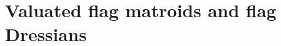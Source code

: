 \documentclass[11pt]{amsart}
\newcommand{\PP}{\mathbb P}
\newcommand{\TT}{\mathbb T}
\newcommand{\trop}{\operatorname{trop}}
\newcommand{\bb}{\mathcal B}
\theoremstyle{definition}
\newtheorem{lem}[thm]{Lemma}
\newtheorem{rem}[thm]{Remark}
\newcommand{\madeline}[1]{{\color{magenta} \sf  Madeline: [#1]}}
\newcommand{\leon}[1]{{\color{teal} \sf Leon: [#1]}}
\newcommand{\chris}[1]{{\color{cyan} \sf Chris: [#1]}}
\begin{document}









\section{Valuated flag matroids and flag Dressians}
\label{section:morph}
\end{document}
